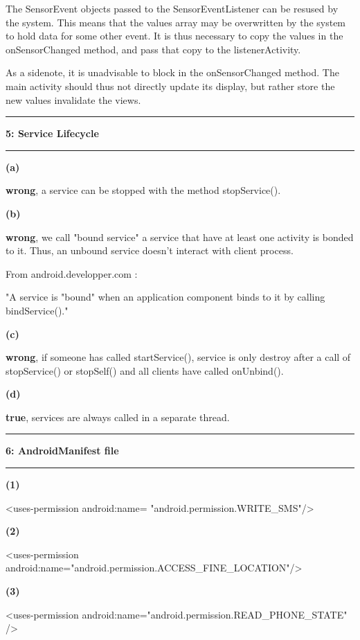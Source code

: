 \documentclass[11pt]{article}
\newcommand\question[2]{\vspace{.25in}\hrule\textbf{#1: #2}\vspace{.5em}\hrule\vspace{.10in}}
\renewcommand\part[1]{\vspace{.10in}\textbf{(#1)}}
\begin{document}
The SensorEvent objects passed to the SensorEventListener can be resused by the system. This means that the values array may be overwritten by the system to hold data for some other event. It is thus necessary to copy the values in the onSensorChanged method, and pass that copy to the listenerActivity.

As a sidenote, it is unadvisable to block in the onSensorChanged method. The main activity should thus not directly update its display, but rather store the new values invalidate the views.

\question{5}{Service Lifecycle} 

\part{a} 

\textbf{wrong}, a service can be stopped with the method stopService().

\part{b}

\textbf{wrong}, we call "bound service" a service that have at least one activity is bonded to it. Thus, an unbound service doesn't interact with client process.

From android.developper.com :

"A service is "bound" when an application component binds to it by calling bindService()."

\part{c}

\textbf{wrong}, if someone has called startService(), service is only destroy after a call of stopService() or stopSelf() and all clients have called onUnbind().

\part{d}

\textbf{true}, services are always called in a separate thread.

\question{6}{AndroidManifest file}

\part{1}

 \textless uses-permission android:name= "android.permission.WRITE\_SMS"/\textgreater 

\part{2}

 \textless uses-permission android:name="android.permission.ACCESS\_FINE\_LOCATION"/\textgreater 

\part{3}

 \textless uses-permission android:name="android.permission.READ\_PHONE\_STATE" /\textgreater 
\end{document}
